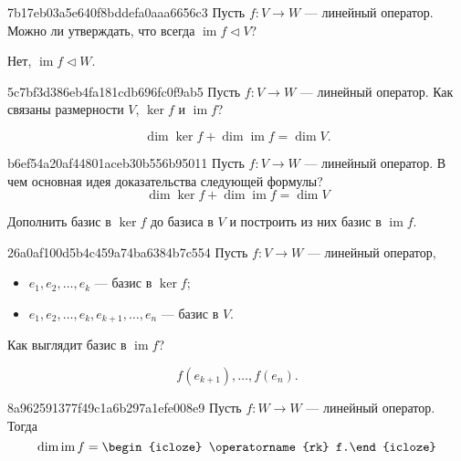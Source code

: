 \begin{note}{7b17eb03a5e640f8bddefa0aaa6656c3}
    Пусть \( f : V \to W \) --- линейный оператор. Можно ли утверждать, что всегда \( \operatorname{im} f \triangleleft V \)?

    \begin{cloze}{1}
        Нет, \( \operatorname{im} f \triangleleft W \).
    \end{cloze}
\end{note}

\begin{note}{5c7bf3d386eb4fa181cdb696fc0f9ab5}
    Пусть \( f : V \to W \) --- линейный оператор. Как связаны размерности \( V \), \( \ker f \) и \( \operatorname{im} f \)?

    \begin{cloze}{1}
        \[
            \dim \ker f + \dim \operatorname{im} f = \dim V.
        \]
    \end{cloze}
\end{note}

\begin{note}{b6ef54a20af44801aceb30b556b95011}
    Пусть \( f : V \to W \) --- линейный оператор. В чем основная идея доказательства следующей формулы?
    \[
        \dim \ker f + \dim \operatorname{im} f = \dim V
    \]

    \begin{cloze}{1}
        Дополнить базис в \( \ker f \) до базиса в \( V \) и построить из них базис в \( \operatorname{im} f \).
    \end{cloze}
\end{note}

\begin{note}{26a0af100d5b4c459a74ba6384b7c554}
    Пусть \( f : V \to W \) --- линейный оператор,
    \begin{itemize}
        \item \( e_1,e_2, \ldots, e_k  \) --- базис в \( \ker f \);
        \item \( e_1,e_2, \ldots, e_k, e_{k+1}, \ldots, e_n  \) --- базис в \( V \).
    \end{itemize}
    Как выглядит базис в \( \operatorname{im} f \)?

    \begin{cloze}{1}
        \[
            f(e_{k+1}), \ldots, f(e_n).
        \]
    \end{cloze}
\end{note}

\begin{note}{8a962591377f49c1a6b297a1efe008e9}
    Пусть \( f : W \to W \) --- линейный оператор. Тогда
    \[
        \dim \operatorname{im} f = \begin{icloze}{1}\operatorname{rk} f.\end{icloze}
    \]
\end{note}

